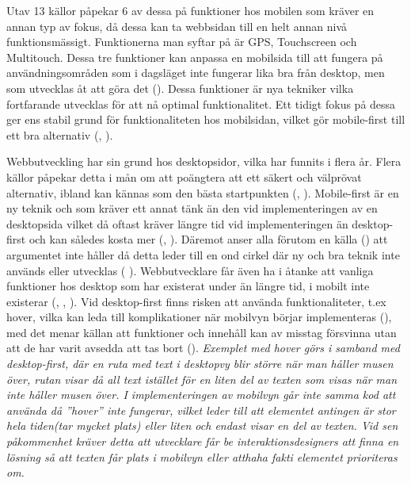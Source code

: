 \documentclass[11pt]{article}
\begin{document}
 Utav 13 källor påpekar 6 av dessa på funktioner hos mobilen som kräver en annan typ av fokus, då dessa kan ta webbsidan till en helt annan nivå funktionsmässigt. Funktionerna man syftar på är GPS, Touchscreen och Multitouch. Dessa tre funktioner kan anpassa en mobilsida till att fungera på användningsområden som i dagsläget inte fungerar lika bra från desktop, men som utvecklas åt att göra det (\cite{sweclock}). Dessa funktioner är nya tekniker vilka fortfarande utvecklas för att nå optimal funktionalitet. Ett tidigt fokus på dessa ger ens stabil grund för funktionaliteten hos mobilsidan, vilket gör mobile-first till ett bra alternativ (\cite{techradar}, \cite{othermedia}).
 
 Webbutveckling har sin grund hos desktopsidor, vilka har funnits i flera år. Flera källor påpekar detta i mån om att poängtera att ett säkert och välprövat alternativ, ibland kan kännas som den bästa startpunkten (\cite{armstrong}, \cite{readyartwork}). Mobile-first är en ny teknik och som kräver ett annat tänk än den vid implementeringen av en desktopsida vilket då oftast kräver längre tid vid implementeringen än desktop-first och kan således kosta mer (\cite{readyartwork}, \cite{marcuspope}). Däremot anser alla förutom en källa (\cite{armstrong}) att argumentet inte håller då detta leder till en ond cirkel där ny och bra teknik inte används eller utvecklas (\cite{designshack} \cite{marcuspope}). Webbutvecklare får även ha i åtanke att vanliga funktioner hos desktop som har existerat under än längre tid, i mobilt inte existerar (\cite{responsivedesign}, \cite{designshack}, \cite{webinsation}). Vid desktop-first finns risken att använda funktionaliteter, t.ex hover, vilka kan leda till komplikationer när mobilvyn börjar implementeras (\cite{readyartwork}), med det menar källan att funktioner och innehåll kan av misstag försvinna utan att de har varit avsedda att tas bort (\cite{readyartwork}). \textit{Exemplet med hover görs i samband med desktop-first, där en ruta med text i desktopvy blir större när man håller musen över, rutan visar då all text istället för en liten del av texten som visas när man inte håller musen över. I implementeringen av mobilvyn går inte samma kod att använda då ”hover” inte fungerar, vilket leder till att elementet antingen är stor hela tiden(tar mycket plats) eller liten och endast visar en del av texten. Vid sen påkommenhet kräver detta att utvecklare får be interaktionsdesigners att finna en lösning så att texten får plats i mobilvyn eller atthaha fakti elementet prioriteras om.}
 
\end{document}
